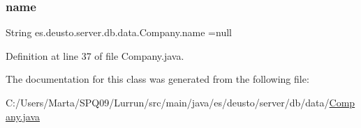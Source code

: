 \subsubsection{\texorpdfstring{name}{name}}
{\footnotesize\ttfamily String es.\+deusto.\+server.\+db.\+data.\+Company.\+name =null\hspace{0.3cm}{\ttfamily [protected]}}



Definition at line 37 of file Company.\+java.



The documentation for this class was generated from the following file\+:\begin{DoxyCompactItemize}
\item 
C\+:/\+Users/\+Marta/\+S\+P\+Q09/\+Lurrun/src/main/java/es/deusto/server/db/data/\hyperlink{_company_8java}{Company.\+java}\end{DoxyCompactItemize}
